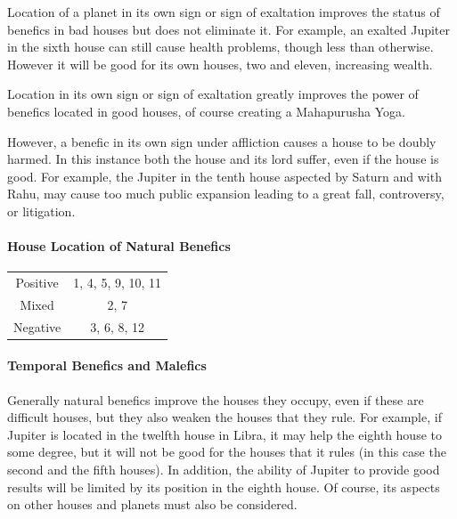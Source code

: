 Location of a planet in its own sign or sign of exaltation improves the status of benefics in bad houses but does not eliminate it. For example, an exalted Jupiter in the sixth house can still cause health problems, though less than otherwise. However it will be good for its own houses, two and eleven, increasing wealth.

 

Location in its own sign or sign of exaltation greatly improves the power of benefics located in good houses, of course creating a Mahapurusha Yoga.

 

However, a benefic in its own sign under affliction causes a house to be doubly harmed. In this instance both the house and its lord suffer, even if the house is good. For example, the Jupiter in the tenth house aspected by Saturn and with Rahu, may cause too much public expansion leading to a great fall, controversy, or litigation.

 

\paragraph{House Location of Natural Benefics}

 
\begin{center}
\begin{tabular}{ c c  }
Positive & 1, 4, 5, 9, 10, 11 \\ 
Mixed & 2, 7 \\  
Negative & 3, 6, 8, 12   
\end{tabular}
\end{center}



\paragraph{Temporal Benefics and Malefics}

 

Generally natural benefics improve the houses they occupy, even if these are difficult houses, but they also weaken the houses that they rule. For example, if Jupiter is located in the twelfth house in Libra, it may help the eighth house to some degree, but it will not be good for the houses that it rules (in this case the second and the fifth houses). In addition, the ability of Jupiter to provide good results will be limited by its position in the eighth house. Of course, its aspects on other houses and planets must also be considered.

